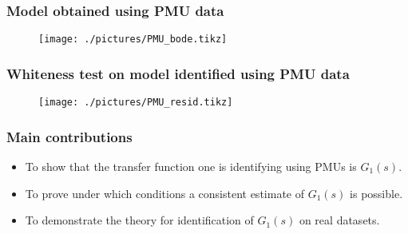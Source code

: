 \begin{frame}
	\frametitle{Model obtained using PMU data}
	\begin{figure}
		\texttt{[image: ./pictures/PMU\_bode.tikz]}
	\end{figure}
\end{frame}
\begin{frame}
	\frametitle{Whiteness test on model identified using PMU data}
	\begin{figure}
		\texttt{[image: ./pictures/PMU\_resid.tikz]}
	\end{figure}
\end{frame}
\begin{frame}
	\frametitle{Main contributions}
	\begin{itemize}
		\item To show that the transfer function one is identifying using PMUs is $G_1(s)$.
		\item To prove under which conditions a consistent estimate of $G_1(s)$ is possible.
		\item To demonstrate the theory for identification of $G_1(s)$ on real datasets.
	\end{itemize}
\end{frame}
